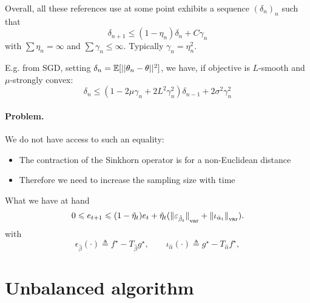 \documentclass[a4paper, 10pt]{article}
\begin{document}
Overall, all these references use at some point exhibits a sequence $(\delta_n)_n$ such that
\begin{equation}
    \delta_{n+1} \leq (1 - \eta_n) \delta_n + C \gamma_n
\end{equation}
with $\sum \eta_n = \infty$ and $\sum \gamma_n \leq \infty$. Typically $\gamma_n = \eta_n^2$.

E.g. from SGD, setting $\delta_n = \mathbb{E}[|| \theta_n - \theta ||^2]$, we have, if objective is $L$-smooth and $\mu$-strongly convex:
\begin{equation}
    \delta_n \leq (1 - 2 \mu \gamma_n   + 2 L^2 \gamma_n^2) \delta_{n-1} + 2 \sigma^2 \gamma_n^2
\end{equation}


\paragraph{Problem.} We do not have access to such an equality:
\begin{itemize}
    \item The contraction of the Sinkhorn operator is for a non-Euclidean distance
    \item Therefore we need to increase the sampling size with time
\end{itemize}

What we have at hand
\begin{equation}\label{eq:Et_rec}
    0 \leqslant e_{t+1} \leqslant 
    (1 - \tilde \eta_t) e_t
    + \tilde \eta_t
    ({\Vert \varepsilon_{\hat \beta_t} \Vert}_{\text{var}} + 
    {\Vert \iota_{\hat \alpha_t} \Vert}_{\text{var}}).
\end{equation}
with
\begin{equation}
    \epsilon_{\hat \beta}(\cdot) \triangleq
    f^\star - T_{\hat \beta}{g^\star} ,\qquad
    \iota_{\hat \alpha}(\cdot) \triangleq 
    g^\star - T_{\hat \alpha}{f^\star},
\end{equation}

\section{Unbalanced algorithm}
\end{document}
